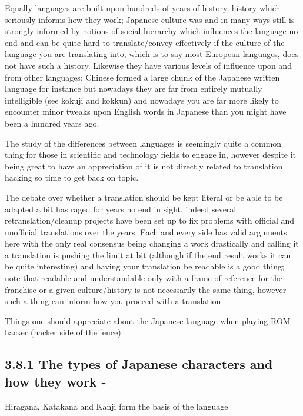 \documentclass[
]{book}
\begin{document}
Equally languages are built upon hundreds of years of history, history which seriously informs how they work; Japanese culture was and in many ways still is strongly informed by notions of social hierarchy which influences the language no end and can be quite hard to translate/convey effectively if the culture of the language you are translating into, which is to say most European languages, does not have such a history. Likewise they have various levels of influence upon and from other languages; Chinese formed a large chunk of the Japanese written language for instance but nowadays they are far from entirely mutually intelligible (see kokuji and kokkun) and nowadays you are far more likely to encounter minor tweaks upon English words in Japanese than you might have been a hundred years ago.

The study of the differences between languages is seemingly quite a common thing for those in scientific and technology fields to engage in, however despite it being great to have an appreciation of it is not directly related to translation hacking so time to get back on topic.

The debate over whether a translation should be kept literal or be able to be adapted a bit has raged for years no end in sight, indeed several retranslation/cleanup projects have been set up to fix problems with official and unofficial translations over the years. Each and every side has valid arguments here with the only real consensus being changing a work drastically and calling it a translation is pushing the limit at bit (although if the end result works it can be quite interesting) and having your translation be readable is a good thing; note that readable and understandable only with a frame of reference for the franchise or a given culture/history is not necessarily the same thing, however such a thing can inform how you proceed with a translation.

Things one should appreciate about the Japanese language when playing ROM hacker (hacker side of the fence)

\hypertarget{the-types-of-japanese-characters-and-how-they-work--}{%
\subsection{3.8.1 The types of Japanese characters and how they work -}\label{the-types-of-japanese-characters-and-how-they-work--}}

Hiragana, Katakana and Kanji form the basis of the language
\end{document}
